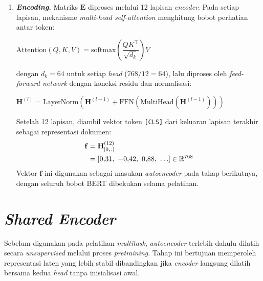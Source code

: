 \begin{enumerate}
    Proses yang sama dilakukan pada seluruh token sehingga diperoleh matriks \textit{embedding} awal $\mathbf{E} \in \mathbb{R}^{10 \times 768}$ sebagai masukan ke lapisan \textit{encoder} BERT.

    \item \textbf{\textit{Encoding}.} Matriks $\mathbf{E}$ diproses melalui 12 lapisan 
    \textit{encoder}. Pada setiap lapisan, mekanisme \textit{multi-head self-attention} 
    menghitung bobot perhatian antar token:
    \begin{center}
        $\text{Attention}(Q, K, V) = \text{softmax}\!\left(\dfrac{QK^\top}{\sqrt{d_k}}\right)V$
    \end{center}
    dengan $d_k = 64$ untuk setiap \textit{head} ($768 / 12 = 64$), lalu diproses 
    oleh \textit{feed-forward network} dengan koneksi residu dan normalisasi:
    \begin{center}
        $\mathbf{H}^{(l)} = \text{LayerNorm}\!\left(\mathbf{H}^{(l-1)} + 
        \text{FFN}\!\left(\text{MultiHead}\!\left(\mathbf{H}^{(l-1)}\right)\right)\right)$
    \end{center}
    Setelah 12 lapisan, diambil vektor token \texttt{[CLS]} dari keluaran lapisan 
    terakhir sebagai representasi dokumen:
    \begin{align}
        \mathbf{f} &= \mathbf{H}^{(12)}_{[0,\, :]} \notag \\
        &= [0{,}31,\ {-}0{,}42,\ 0{,}88,\ \ldots] \in \mathbb{R}^{768}
        \label{eq:cls_extraction}
    \end{align}
    Vektor $\mathbf{f}$ ini digunakan sebagai masukan \textit{autoencoder} pada 
    tahap berikutnya, dengan seluruh bobot BERT dibekukan selama pelatihan.
        
\end{enumerate}

\section{\textit{Shared Encoder}}
\label{sec:shared_encoder}

Sebelum digunakan pada pelatihan \textit{multitask}, \textit{autoencoder}
terlebih dahulu dilatih secara \textit{unsupervised} melalui proses
\textit{pretraining}. Tahap ini bertujuan memperoleh representasi laten
yang lebih stabil dibandingkan jika \textit{encoder} langsung dilatih
bersama kedua \textit{head} tanpa inisialisasi awal.


